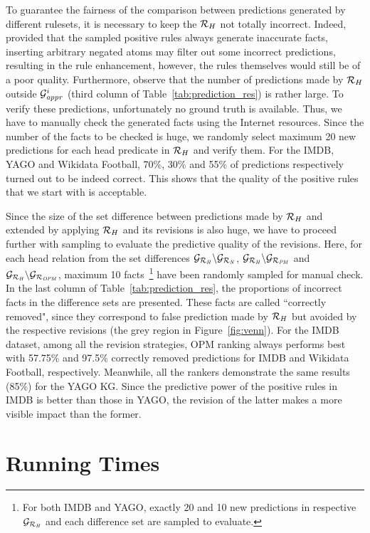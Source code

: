 To guarantee the fairness of the comparison between predictions generated by different rulesets, it is necessary to keep the $\mathcal{R}_H$ not totally incorrect. Indeed, provided that the sampled positive rules always generate inaccurate facts, inserting arbitrary negated atoms may filter out some incorrect predictions, resulting in the rule enhancement, however, the rules themselves would still be of a poor quality. Furthermore, observe that the number of predictions made by $\mathcal{R}_H$ outside $\mathcal{G}^i_{\mathit{appr}}$ (third column of Table~\ref{tab:prediction_res}) is rather large. To verify these predictions, unfortunately no ground truth is available. Thus, we have to manually check the generated facts using the Internet resources. Since the number of the facts to be checked is huge, we randomly select maximum 20 new predictions for each head predicate in $\mathcal{R}_H$ and verify them. For the IMDB, YAGO and Wikidata Football, 70\%, 30\% and 55\% of predictions respectively turned out to be indeed correct. This shows that the quality of the positive rules that we start with is acceptable.

Since the size of the set difference between predictions made by $\mathcal{R}_H$ and extended by applying $\mathcal{R}_H$ and its revisions is also huge, we have to proceed further with sampling to evaluate the predictive quality of the revisions. Here, for each head relation from the set differences $\mathcal{G}_{\mathcal{R}_{\mathit{H}}}\backslash \mathcal{G}_{\mathcal{R}_{\mathit{N}}}$, $\mathcal{G}_{\mathcal{R}_{\mathit{H}}}\backslash \mathcal{G}_{\mathcal{R}_{\mathit{PM}}}$ and $\mathcal{G}_{\mathcal{R}_{\mathit{H}}}\backslash \mathcal{G}_{\mathcal{R}_{\mathit{OPM}}}$, maximum 10 facts~\footnote{For both IMDB and YAGO, exactly 20 and 10 new predictions in respective $\mathcal{G}_{\mathcal{R}_{\mathit{H}}}$ and each difference set are sampled to evaluate.} have been randomly sampled for manual check. In the last column of Table~\ref{tab:prediction_res}, the proportions of incorrect facts in the difference sets are presented. These facts are called ``correctly removed", since they correspond to false prediction made by $\mathcal{R}_H$ but avoided by the respective revisions (the grey region in Figure~\ref{fig:venn}). For the IMDB dataset, among all the revision strategies, OPM ranking always performs best with 57.75\% and 97.5\% correctly removed predictions for IMDB and Wikidata Football, respectively. Meanwhile, all the rankers demonstrate the same results (85\%) for the YAGO KG. Since the predictive power of the positive rules in IMDB is better than those in YAGO, the revision of the latter makes a more visible impact than the former.

\section{Running Times}

